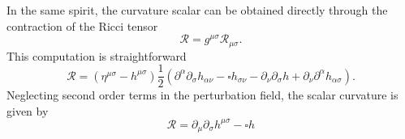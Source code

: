 \documentclass{article}
\begin{document}
In the same spirit, the curvature scalar can be obtained directly through
the contraction of the Ricci tensor
\begin{equation}
    \mathcal{R} = g^{\mu\sigma}\mathcal{R}_{\mu\sigma}.
\end{equation}
This computation is straightforward
\begin{equation}
    \mathcal{R} = \left(\eta^{\mu\sigma} - h^{\mu\sigma}\right) \frac{1}{2}\left(
        \partial^{\alpha}\partial_{\sigma}h_{\alpha\nu} 
        -  \square h_{\sigma\nu} - \partial_{\nu}\partial_{\sigma}h
        + \partial_{\nu}\partial^{\alpha}h_{\alpha\sigma}\right).
\end{equation}
Neglecting second order terms in the perturbation field, the scalar curvature is given
by
\begin{equation}
    \label{curvature scalar flat + perturbation}
    \mathcal{R} = \partial_{\mu}\partial_{\sigma}h^{\mu\sigma} - \square h
\end{equation}
\end{document}

